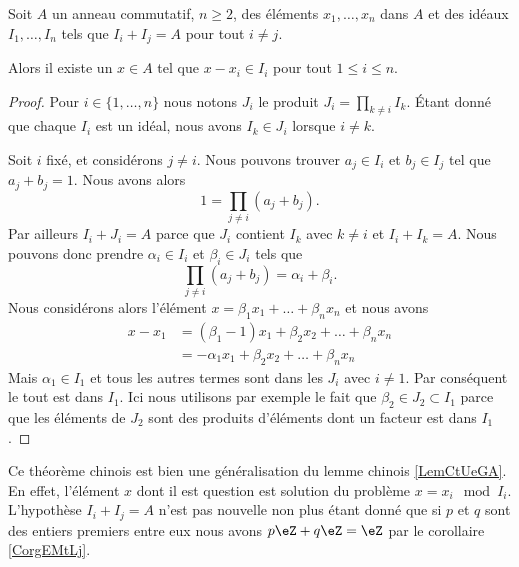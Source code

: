 \begin{theorem}
    Soit \( A\) un anneau commutatif, \( n\geq 2\), des éléments \( x_1,\ldots,x_n\) dans \( A\) et des idéaux \( I_1,\ldots,I_n\) tels que \( I_i+I_j=A\) pour tout \( i\neq j\).

    Alors il existe un \( x\in A\) tel que \( x-x_i\in I_i\) pour tout \( 1\leq i\leq n\).
\end{theorem}

\begin{proof}
    Pour \( i\in\{ 1,\ldots,n \}\) nous notons \( J_i\) le produit \( J_i=\prod_{k\neq i}I_k\). Étant donné que chaque \( I_i\) est un idéal, nous avons \( I_k\in J_i\) lorsque \( i\neq k\).

    Soit \( i\) fixé, et considérons \( j\neq i\). Nous pouvons trouver \( a_j\in I_i\) et \( b_j\in I_j\) tel que \( a_j+b_j=1\). Nous avons alors
    \begin{equation}
        1=\prod_{j\neq i}(a_j+b_j).
    \end{equation}
    Par ailleurs \( I_i+J_i=A\) parce que \( J_i\) contient \( I_k\) avec \( k\neq i\) et \( I_i+I_k=A\). Nous pouvons donc prendre \( \alpha_i\in I_i\) et \( \beta_i\in J_i\) tels que
    \begin{equation}
        \prod_{j\neq i}(a_j+b_j)=\alpha_i+\beta_i.
    \end{equation}
    Nous considérons alors l'élément \( x=\beta_1x_1+\ldots+\beta_nx_n\) et nous avons
    \begin{subequations}
        \begin{align}
            x-x_1&=(\beta_1-1)x_1+\beta_2x_2+\ldots+\beta_nx_n\\
            &=-\alpha_1x_1+\beta_2x_2+\ldots+\beta_nx_n
        \end{align}
    \end{subequations}
    Mais \( \alpha_1\in I_1\) et tous les autres termes sont dans les \( J_i\) avec \( i\neq 1\). Par conséquent le tout est dans \( I_1\). Ici nous utilisons par exemple le fait que \( \beta_2\in J_2\subset I_1\) parce que les éléments de \( J_2\) sont des produits d'éléments dont un facteur est dans \( I_1\).
\end{proof}

\begin{remark}
    Ce théorème chinois est bien une généralisation du lemme chinois \ref{LemCtUeGA}. En effet, l'élément \( x\) dont il est question est solution du problème \( x=x_i\mod I_i\). L'hypothèse \( I_i+I_j=A\) n'est pas nouvelle non plus étant donné que si \( p\) et \( q\) sont des entiers premiers entre eux nous avons \( p\eZ+q\eZ=\eZ\) par le corollaire \ref{CorgEMtLj}.
\end{remark}

